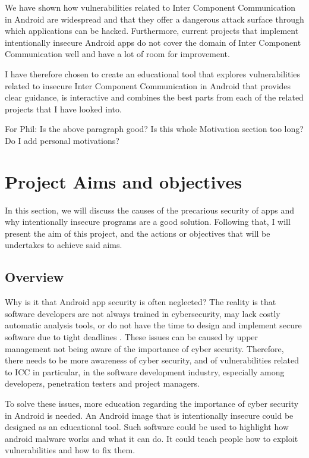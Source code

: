 		We have shown how vulnerabilities related to Inter Component Communication in Android are widespread and that they offer a dangerous attack surface through which applications can be hacked. Furthermore, current projects that implement intentionally insecure Android apps do not cover the domain of Inter Component Communication well and have a lot of room for improvement. 
		
		I have therefore chosen to create an educational tool that explores vulnerabilities related to insecure Inter Component Communication in Android that provides clear guidance, is interactive and combines the best parts from each of the related projects that I have looked into.
		
		For Phil: Is the above paragraph good? Is this whole Motivation section too long? Do I add personal motivations?
		
	\section{Project Aims and objectives}
		\label{sec:intro_objective} 
		
		In this section, we will discuss the causes of the precarious security of apps and why intentionally insecure programs are a good solution. Following that, I will present the aim of this project, and the actions or objectives that will be undertakes to achieve said aims. 
		
		\subsection{Overview}
		
		Why is it that Android app security is often neglected? The reality is that software developers are not always trained in cybersecurity, may lack costly automatic analysis tools, or do not have the time to design and implement secure software due to tight deadlines \cite{malwarebytes_blog}. These issues can be caused by upper management not being aware of the importance of cyber security. Therefore, there needs to be more awareness of cyber security, and of vulnerabilities related to ICC in particular, in the software development industry, especially among developers, penetration testers and project managers.
		
		To solve these issues, more education regarding the importance of cyber security in Android is needed. An Android image that is intentionally insecure could be designed as an educational tool. Such software could be used to highlight how android malware works and what it can do. It could teach people how to exploit vulnerabilities and how to fix them.
		
